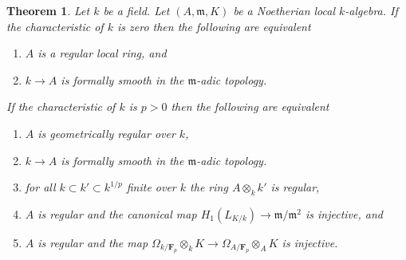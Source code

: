 \documentclass[10pt,a4paper]{amsart}
\theoremstyle{plain}
\newtheorem{theorem}[subsection]{Theorem}
\theoremstyle{definition}
\theoremstyle{remark}
\numberwithin{equation}{subsection}
\begin{document}
\begin{theorem}
\label{theorem-regular-fs}
Let $k$ be a field. Let $(A, \mathfrak m, K)$ be a Noetherian local
$k$-algebra. If the characteristic of $k$ is zero then the following
are equivalent
\begin{enumerate}
\item $A$ is a regular local ring, and
\item $k \to A$ is formally smooth in the $\mathfrak m$-adic topology.
\end{enumerate}
If the characteristic of $k$ is $p > 0$ then the following are equivalent
\begin{enumerate}
\item $A$ is geometrically regular over $k$,
\item $k \to A$ is formally smooth in the $\mathfrak m$-adic topology.
\item for all $k \subset k' \subset k^{1/p}$
finite over $k$ the ring $A \otimes_k k'$ is regular,
\item $A$ is regular and the canonical map
$H_1(L_{K/k}) \to \mathfrak m/\mathfrak m^2$ is injective, and
\item $A$ is regular and the map
$\Omega_{k/\mathbf{F}_p} \otimes_k K \to \Omega_{A/\mathbf{F}_p} \otimes_A K$
is injective.
\end{enumerate}
\end{theorem}
\end{document}
